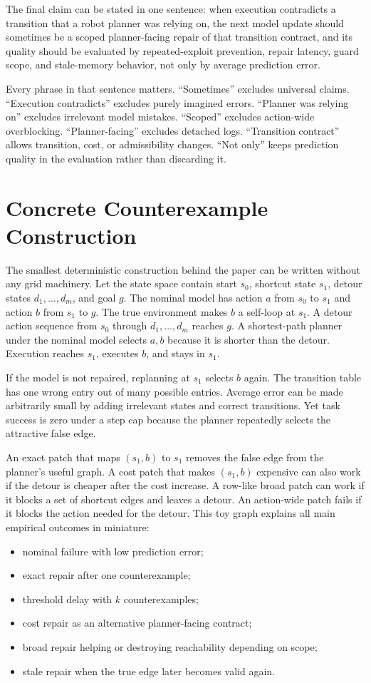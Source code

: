 \documentclass{article}
\begin{document}
The final claim can be stated in one sentence: when execution contradicts a transition that a robot planner was relying on, the next model update should sometimes be a scoped planner-facing repair of that transition contract, and its quality should be evaluated by repeated-exploit prevention, repair latency, guard scope, and stale-memory behavior, not only by average prediction error.

Every phrase in that sentence matters. ``Sometimes'' excludes universal claims. ``Execution contradicts'' excludes purely imagined errors. ``Planner was relying on'' excludes irrelevant model mistakes. ``Scoped'' excludes action-wide overblocking. ``Planner-facing'' excludes detached logs. ``Transition contract'' allows transition, cost, or admissibility changes. ``Not only'' keeps prediction quality in the evaluation rather than discarding it.

\section{Concrete Counterexample Construction}

The smallest deterministic construction behind the paper can be written without any grid machinery. Let the state space contain start $s_0$, shortcut state $s_1$, detour states $d_1,\ldots,d_m$, and goal $g$. The nominal model has action $a$ from $s_0$ to $s_1$ and action $b$ from $s_1$ to $g$. The true environment makes $b$ a self-loop at $s_1$. A detour action sequence from $s_0$ through $d_1,\ldots,d_m$ reaches $g$. A shortest-path planner under the nominal model selects $a,b$ because it is shorter than the detour. Execution reaches $s_1$, executes $b$, and stays in $s_1$.

If the model is not repaired, replanning at $s_1$ selects $b$ again. The transition table has one wrong entry out of many possible entries. Average error can be made arbitrarily small by adding irrelevant states and correct transitions. Yet task success is zero under a step cap because the planner repeatedly selects the attractive false edge.

An exact patch that maps $(s_1,b)$ to $s_1$ removes the false edge from the planner's useful graph. A cost patch that makes $(s_1,b)$ expensive can also work if the detour is cheaper after the cost increase. A row-like broad patch can work if it blocks a set of shortcut edges and leaves a detour. An action-wide patch fails if it blocks the action needed for the detour. This toy graph explains all main empirical outcomes in miniature:
\begin{itemize}
    \item nominal failure with low prediction error;
    \item exact repair after one counterexample;
    \item threshold delay with $k$ counterexamples;
    \item cost repair as an alternative planner-facing contract;
    \item broad repair helping or destroying reachability depending on scope;
    \item stale repair when the true edge later becomes valid again.
\end{itemize}
\end{document}
